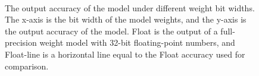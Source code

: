\begin{figure}[htp]
\centering
{}
\\

\caption{The output accuracy of the model under different weight bit widths. The x-axis is the bit width of the model weights, and the y-axis is the output accuracy of the model. Float is the output of a full-precision weight model with 32-bit floating-point numbers, and Float-line is a horizontal line equal to the Float accuracy used for comparison.}
\label{fig:accuracy_at_bits}
\end{figure}

